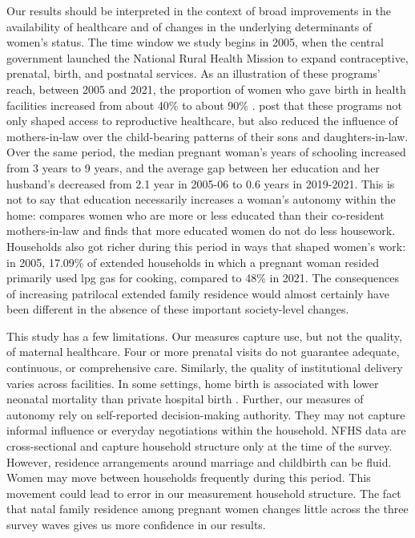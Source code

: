 \documentclass[10pt,twoside,reqno]{article}
\begin{document}
Our results should be interpreted in the context of broad improvements in the availability of healthcare and of changes in the underlying determinants of women's status.  The time window we study begins in 2005, when the central government launched the National Rural Health Mission to expand contraceptive, prenatal, birth, and postnatal services.  As an illustration of these programs' reach, between 2005 and 2021, the proportion of women who gave birth in health facilities increased from about 40\% to about 90\% \citep{IIPS2007NFHS3,IIPS2021NFHS5}.  \cite{char2010influence} post that these programs not only shaped access to reproductive healthcare, but also reduced the influence of mothers-in-law over the child-bearing patterns of their sons and daughters-in-law.  Over the same period, the median pregnant woman's years of schooling increased from 3 years to 9 years, and the average gap between her education and her husband's decreased from 2.1 year in 2005-06 to 0.6 years in 2019-2021.  This is not to say that education necessarily increases a woman's autonomy within the home: \cite{srivastava2020time} compares women who are more or less educated than their co-resident mothers-in-law and finds that more educated women do not do less housework.  Households also got richer during this period in ways that shaped women's work: in 2005, 17.09\% of extended households in which a pregnant woman resided primarily used lpg gas  for cooking, compared to 48\% in 2021.  The consequences of increasing patrilocal extended family residence would almost certainly have been different in the absence of these important society-level changes.

This study has a few limitations. Our measures capture use, but not the quality, of maternal healthcare. Four or more prenatal visits do not guarantee adequate, continuous, or comprehensive care. Similarly, the quality of institutional delivery varies across facilities.  In some settings, home birth is associated with lower neonatal mortality than private hospital birth \citep{coffey2025excess}. Further, our measures of autonomy rely on self-reported decision-making authority. They may not capture informal influence or everyday negotiations within the household. NFHS data are cross-sectional and capture household structure only at the time of the survey. However, residence arrangements around marriage and childbirth can be fluid. Women may move between households frequently during this period. This movement could lead to error in our measurement household structure.  The fact that natal family residence among pregnant women changes little across the three survey waves gives us more confidence in our results.
\end{document}
